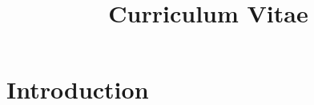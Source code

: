 \documentclass[11pt,a4paper,sans]{moderncv} %
\title{Curriculum Vitae}
\begin{document}
\makecvtitle %


\section{Introduction}

\end{document}
